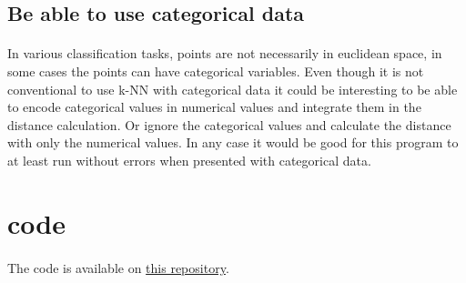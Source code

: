 \documentclass[11 pt]{article}
\begin{document}
\subsection{Be able to use categorical data}
\paragraph{}In various classification tasks, points are not necessarily in euclidean space, in some cases the points can have categorical variables. Even though it is not conventional to use k-NN with categorical data it could be interesting to be able to encode categorical values in numerical values and integrate them in the distance calculation. Or ignore the categorical values and calculate the distance with only the numerical values. In any case it would be good for this program to at least run without errors when presented with categorical data.

\nocite{*}



\appendix
\section{code}
\paragraph{}The code is available on \href{https://gitlab.com/zlanderous/complexite_projet}{this repository}.
\end{document}
